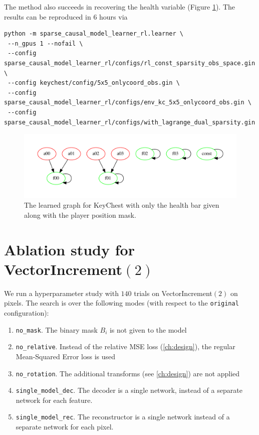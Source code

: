 \documentclass[a4paper,11pt,oneside]{report}
\begin{document}
The method also succeeds in recovering the health variable (Figure \ref{fig:kc_onlycoord_adaptivelearnedgraph}). The results can be reproduced in 6 hours via
\begin{verbatim}
python -m sparse_causal_model_learner_rl.learner \
 --n_gpus 1 --nofail \
 --config sparse_causal_model_learner_rl/configs/rl_const_sparsity_obs_space.gin \
 --config keychest/config/5x5_onlycoord_obs.gin \
 --config sparse_causal_model_learner_rl/configs/env_kc_5x5_onlycoord_obs.gin \
 --config sparse_causal_model_learner_rl/configs/with_lagrange_dual_sparsity.gin
\end{verbatim}

\begin{figure}
    \centering
    \includegraphics[width=0.6\linewidth]{plots/kc_onlycoord_graph}
    \caption{The learned graph for KeyChest with only the health bar given along with the player position mask.}
    \label{fig:kc_onlycoord_adaptivelearnedgraph}
\end{figure}

\section{Ablation study for VectorIncrement$(2)$}
We run a hyperparameter study with $140$ trials on VectorIncrement$(2)$ on pixels. The search is over the following modes (with respect to the {\tt original} configuration):
\begin{enumerate}
    \item {\tt no\_mask}. The binary mask $B_i$ is not given to the model
    \item {\tt no\_relative}. Instead of the relative MSE loss (\autoref{ch:design}), the regular Mean-Squared Error loss is used
    \item {\tt no\_rotation}. The additional transforms (see \autoref{ch:design}) are not applied
    \item {\tt single\_model\_dec}. The decoder is a single network, instead of a separate network for each feature.
    \item {\tt single\_model\_rec}. The reconstructor is a single network instead of a separate network for each pixel.
\end{enumerate}
\end{document}
